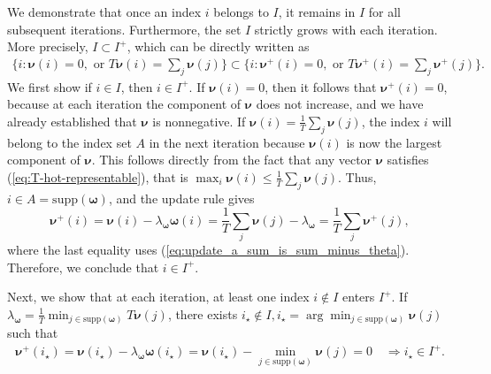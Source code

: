 \documentclass[11pt,letterpaper]{article}
\newcommand{\supp}{\mathrm{supp}}
\begin{document}
We demonstrate that once an index $i$ belongs to $I$, it remains in $I$ for all subsequent iterations. Furthermore, the set $I$ strictly grows with each iteration. More precisely, $ I \subset I^+$, which can be directly written as
\begin{align}
    \{ i : \boldsymbol{\nu}(i) = 0, \text{ or } T\boldsymbol{\nu}(i) = \sum_j \boldsymbol{\nu}(j) \} \subset \{ i : \boldsymbol{\nu}^+(i) = 0, \text{ or } T\boldsymbol{\nu}^+(i) = \sum_j \boldsymbol{\nu}^+(j) \}. \label{eq:I_increasing}
\end{align}
We first show if $i \in I$, then $i \in I^+$.
If $\boldsymbol{\nu}({i}) = 0$, then it follows that $\boldsymbol{\nu}^+({i}) = 0$, because at each iteration the component of $\boldsymbol{\nu}$ does not increase, and we have already established that $\boldsymbol{\nu}$ is nonnegative.  If $\boldsymbol{\nu}(i) = \frac{1}{T}\sum_j \boldsymbol{\nu}(j)$, the index $i$ will belong to the index set $A$ in the next iteration because $\boldsymbol{\nu}(i)$ is now the largest component of $\boldsymbol{\nu}$. This follows directly from the fact that any vector $\boldsymbol{\nu}$ satisfies (\ref{eq:T-hot-representable}), that is $\max_i \boldsymbol{\nu}(i) \leq\tfrac{1}{T} \sum_j \boldsymbol{\nu}(j)$. Thus, $i \in A = \supp(\boldsymbol{\omega})$, and  the update rule gives
\[
\boldsymbol{\nu}^{+}({i})
    = \boldsymbol{\nu}({i}) -\lambda_{\boldsymbol{\omega}}\boldsymbol{\omega}({i}) 
    = \frac{1}{T}\sum_j \boldsymbol{\nu}(j) - \lambda_{\boldsymbol{\omega}}
    = \frac{1}{T}\sum_j \boldsymbol{\nu}^{+}(j),
\]
where the last equality uses (\ref{eq:update_a_sum_is_sum_minus_theta}). Therefore, we conclude that $i \in I^+$. 

Next, we show that at each iteration, at least one index $i \notin I$ enters $I^+$. If $ \lambda_{\boldsymbol{\omega}}= \tfrac{1}{T}\min_{j \in \supp(\boldsymbol{\omega})}T\boldsymbol{\nu}(j)$, there exists $ i_{\star} \notin I, i_{\star} = \arg\min_{j \in \supp(\boldsymbol{\omega})} \boldsymbol{\nu}(j)$ such that 
\begin{align}
    \boldsymbol{\nu}^+({i_{\star}}) = \boldsymbol{\nu}({i_{\star}}) - \lambda_{\boldsymbol{\omega}}\boldsymbol{\omega}({i_{\star}}) = \boldsymbol{\nu}({i_{\star}}) - \min_{j \in \supp(\boldsymbol{\omega})} \boldsymbol{\nu}(j) = 0 \quad \Rightarrow {i_{\star}} \in I^+ .\label{eq:a_enters_0}
\end{align}
\end{document}
